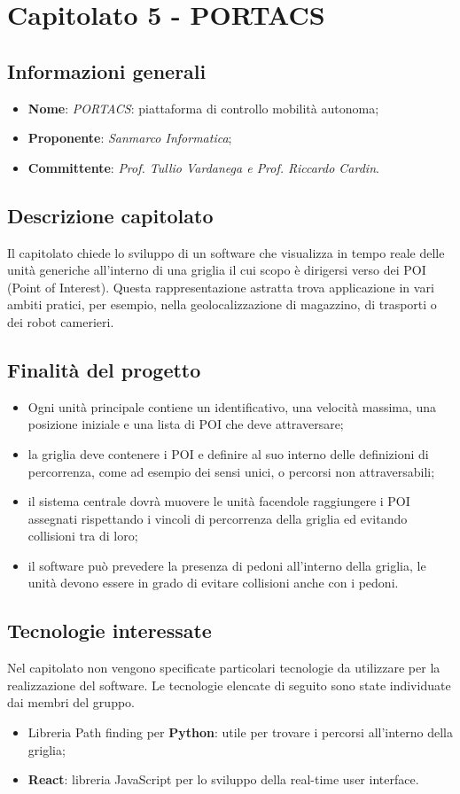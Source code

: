 \section{Capitolato 5 - PORTACS}
\subsection{Informazioni generali}
\begin{itemize}
    \item \textbf{Nome}: \emph{PORTACS}: piattaforma di controllo mobilità autonoma;
    \item \textbf{Proponente}: \emph{Sanmarco Informatica};
    \item \textbf{Committente}: \emph{Prof. Tullio Vardanega e Prof. Riccardo Cardin}.
\end{itemize}
\subsection{Descrizione capitolato}
Il capitolato chiede lo sviluppo di un software che visualizza in tempo reale delle unità generiche all'interno di una griglia il cui scopo è dirigersi verso dei POI (Point of Interest). Questa rappresentazione astratta trova applicazione in vari ambiti pratici, per esempio, nella geolocalizzazione di magazzino, di trasporti o dei robot camerieri.
\subsection{Finalità del progetto}
\begin{itemize}
    \item Ogni unità principale contiene un identificativo, una velocità massima, una posizione iniziale e una lista di POI che deve attraversare;
    \item la griglia deve contenere i POI e definire al suo interno delle definizioni di percorrenza, come ad esempio dei sensi unici, o percorsi non attraversabili;
    \item il sistema centrale dovrà muovere le unità facendole raggiungere i POI assegnati rispettando i vincoli di percorrenza della griglia ed evitando collisioni tra di loro;
    \item il software può prevedere la presenza di pedoni all'interno della griglia, le unità devono essere in grado di evitare collisioni anche con i pedoni.
\end{itemize}
\subsection{Tecnologie interessate}
Nel capitolato non vengono specificate particolari tecnologie da utilizzare per la realizzazione del software. Le tecnologie elencate di seguito sono state individuate dai membri del gruppo.
\begin{itemize}
    \item Libreria Path finding per \textbf{Python}: utile per trovare i percorsi all’interno della griglia;
    \item \textbf{React}: libreria JavaScript per lo sviluppo della real-time user interface.
\end{itemize}
